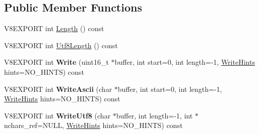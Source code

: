 \subsection*{Public Member Functions}
\begin{DoxyCompactItemize}
\item 
V8\+E\+X\+P\+O\+R\+T int \hyperlink{classv8_1_1_string_a812edd5c3beffb3a08ff94103ac31f23}{Length} () const 
\item 
V8\+E\+X\+P\+O\+R\+T int \hyperlink{classv8_1_1_string_a11d12cdcd49afe5a8bb12646fd8ec17a}{Utf8\+Length} () const 
\item 
\hypertarget{classv8_1_1_string_a6df213d64dab530fd6ae7e1c0c56d41c}{}V8\+E\+X\+P\+O\+R\+T int {\bfseries Write} (uint16\+\_\+t $\ast$buffer, int start=0, int length=-\/1, \hyperlink{classv8_1_1_string_a7f9e89f3314177022a47f2ddac7fcb6f}{Write\+Hints} hints=N\+O\+\_\+\+H\+I\+N\+T\+S) const \label{classv8_1_1_string_a6df213d64dab530fd6ae7e1c0c56d41c}

\item 
\hypertarget{classv8_1_1_string_a28a3f3cb162b3e3ea8361f78aec0c39d}{}V8\+E\+X\+P\+O\+R\+T int {\bfseries Write\+Ascii} (char $\ast$buffer, int start=0, int length=-\/1, \hyperlink{classv8_1_1_string_a7f9e89f3314177022a47f2ddac7fcb6f}{Write\+Hints} hints=N\+O\+\_\+\+H\+I\+N\+T\+S) const \label{classv8_1_1_string_a28a3f3cb162b3e3ea8361f78aec0c39d}

\item 
\hypertarget{classv8_1_1_string_a66d5612830e3c00e7b55cb4d819ae26e}{}V8\+E\+X\+P\+O\+R\+T int {\bfseries Write\+Utf8} (char $\ast$buffer, int length=-\/1, int $\ast$nchars\+\_\+ref=N\+U\+L\+L, \hyperlink{classv8_1_1_string_a7f9e89f3314177022a47f2ddac7fcb6f}{Write\+Hints} hints=N\+O\+\_\+\+H\+I\+N\+T\+S) const \label{classv8_1_1_string_a66d5612830e3c00e7b55cb4d819ae26e}


\end{DoxyCompactItemize}
